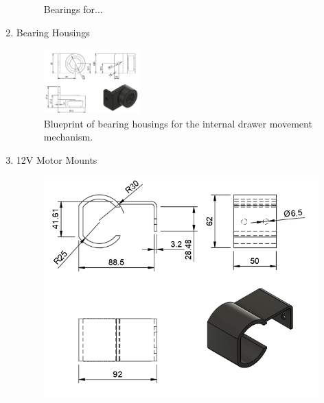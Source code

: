 \begin{enumerate}
\begin{figure}[H]
                \caption{Bearings for...}
                \label{fig:etiqueta}
            \end{figure}
        \item Bearing Housings
        \begin{figure}[H]
                \centering
                \includegraphics[width=0.35\textwidth]{PLANOS/PLANO_CHUMACERA.png}
                \caption{Blueprint of bearing housings for the internal drawer movement mechanism.}
                \label{fig:etiqueta}
            \end{figure}
        \item 12V Motor Mounts
            \begin{figure}[H]
            \centering
            \begin{minipage}{0.45\textwidth}
                \centering
                \includegraphics[width=\textwidth]{PLANOS/PLANO_SOPORTE_MOTOR_1.png}
                \caption{}
                \label{fig:imagen1}
            \end{minipage}%
            \hfill
            \begin{minipage}{0.45\textwidth}
                \centering

\end{minipage}
\end{figure}
\end{enumerate}
